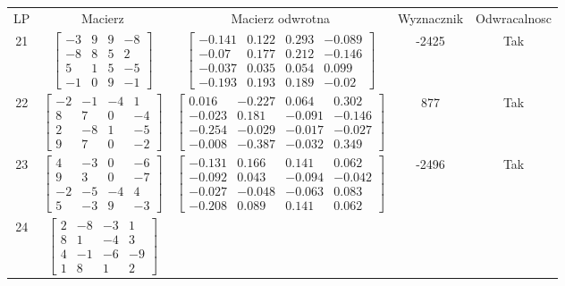 \documentclass[a4paper,12pt]{article}
\begin{document}
\bgroup {} \vspace{0.2in} \begin{tabular}{c c c c c}
LP & Macierz & Macierz odwrotna & Wyznacznik & Odwracalnosc\\
21
&
$\begin{bmatrix} -3 & 9 & 9 & -8 \\ -8 & 8 & 5 & 2 \\ 5 & 1 & 5 & -5 \\ -1 & 0 & 9 & -1 \end{bmatrix}$
&
$\begin{bmatrix} -0.141 & 0.122 & 0.293 & -0.089 \\ -0.07 & 0.177 & 0.212 & -0.146 \\ -0.037 & 0.035 & 0.054 & 0.099 \\ -0.193 & 0.193 & 0.189 & -0.02 \end{bmatrix}$
&
-2425
&
Tak
\\
22
&
$\begin{bmatrix} -2 & -1 & -4 & 1 \\ 8 & 7 & 0 & -4 \\ 2 & -8 & 1 & -5 \\ 9 & 7 & 0 & -2 \end{bmatrix}$
&
$\begin{bmatrix} 0.016 & -0.227 & 0.064 & 0.302 \\ -0.023 & 0.181 & -0.091 & -0.146 \\ -0.254 & -0.029 & -0.017 & -0.027 \\ -0.008 & -0.387 & -0.032 & 0.349 \end{bmatrix}$
&
877
&
Tak
\\
23
&
$\begin{bmatrix} 4 & -3 & 0 & -6 \\ 9 & 3 & 0 & -7 \\ -2 & -5 & -4 & 4 \\ 5 & -3 & 9 & -3 \end{bmatrix}$
&
$\begin{bmatrix} -0.131 & 0.166 & 0.141 & 0.062 \\ -0.092 & 0.043 & -0.094 & -0.042 \\ -0.027 & -0.048 & -0.063 & 0.083 \\ -0.208 & 0.089 & 0.141 & 0.062 \end{bmatrix}$
&
-2496
&
Tak
\\
24
&
$\begin{bmatrix} 2 & -8 & -3 & 1 \\ 8 & 1 & -4 & 3 \\ 4 & -1 & -6 & -9 \\ 1 & 8 & 1 & 2 \end{bmatrix}$

\end{tabular}
\end{document}
